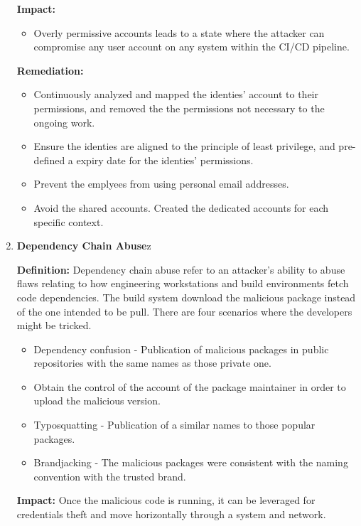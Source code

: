 \begin{enumerate}[label=(\arabic*)]
    \textbf{Impact: }
        \begin{itemize}
            \item Overly permissive accounts leads to a state where the attacker can compromise any user
            account on any system within the CI/CD pipeline.
        \end{itemize}

    \textbf{Remediation:}
        \begin{itemize}
            \item Continuously analyzed and mapped the identies' account to their permissions, and removed the 
            the permissions not necessary to the ongoing work.
            \item Ensure the identies are aligned to the principle of least privilege, and pre-defined a expiry date 
            for the identies' permissions.
            \item Prevent the emplyees from using personal email addresses.
            \item Avoid the shared accounts. Created the dedicated accounts for each specific context.
        \end{itemize}
    \item \textbf{Dependency Chain Abuse}z

    \textbf{Definition: }
        Dependency chain abuse refer to an attacker's ability to abuse flaws relating to how 
        engineering workstations and build environments fetch code dependencies. The build system download the 
        malicious package instead of the one intended to be pull. There are four scenarios where the developers might be tricked.
        \begin{itemize}
            \item Dependency confusion - Publication of malicious packages in public repositories with the same 
            names as those private one.
            \item Obtain the control of the account of the package maintainer in order to upload the malicious version.
            \item Typosquatting - Publication of a similar names to those popular packages.
            \item Brandjacking - The malicious packages were consistent with the naming convention with the trusted brand.
        \end{itemize}

    \textbf{Impact: }
        Once the malicious code is running, it can be leveraged for credentials theft and move horizontally through a system and 
        network.


\end{enumerate}
